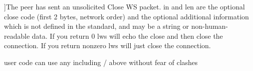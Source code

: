 \begin{Desc}
\begin{description}
{}]The peer has sent an unsolicited Close WS packet. in and len are the optional close code (first 2 bytes, network order) and the optional additional information which is not defined in the standard, and may be a string or non-\/human-\/ readable data. If you return 0 lws will echo the close and then close the connection. If you return nonzero lws will just close the connection. \item[{\em 
L\+W\+S\+\_\+\+C\+A\+L\+L\+B\+A\+C\+K\+\_\+\+U\+S\+ER\hypertarget{group__usercb_ggad62860e19975ba4c4af401c3cdb6abf7a982579753e70e59a9ea13ce628ac891a}{}\label{group__usercb_ggad62860e19975ba4c4af401c3cdb6abf7a982579753e70e59a9ea13ce628ac891a}
}]user code can use any including / above without fear of clashes \end{description}
\end{Desc}

